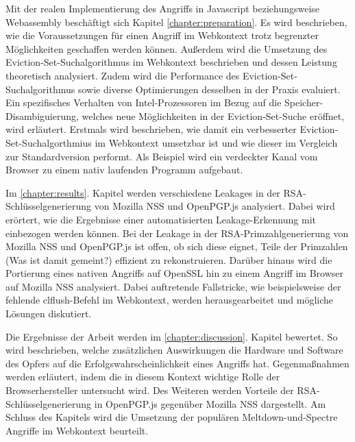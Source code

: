 \par \medskip                     

Mit der realen Implementierung des Angriffs in Javascript beziehungsweise Webassembly beschäftigt sich Kapitel \ref{chapter:preparation}.
Es wird beschrieben, wie die Voraussetzungen für einen Angriff im Webkontext trotz begrenzter Möglichkeiten geschaffen werden können.
Außerdem wird die Umsetzung des Eviction-Set-Suchalgorithmus im Webkontext beschrieben und dessen Leistung theoretisch analysiert.
Zudem wird die Performance des Eviction-Set-Suchalgorithmus sowie diverse Optimierungen desselben in der Praxis evaluiert.
Ein spezifisches Verhalten von Intel-Prozessoren im Bezug auf die Speicher-Disambiguierung, welches neue Möglichkeiten in der Eviction-Set-Suche eröffnet, wird erläutert.
Erstmals wird beschrieben, wie damit ein verbesserter Eviction-Set-Suchalgorthmius im Webkontext umsetzbar ist und wie dieser im Vergleich zur Standardversion performt.
Als Beispiel wird ein verdeckter Kanal vom Browser zu einem nativ laufenden Programm aufgebaut.

\par \medskip                      

Im \ref{chapter:results}. Kapitel werden verschiedene Leakages in der RSA-Schlüsselgenerierung von Mozilla NSS und OpenPGP.js analysiert.
Dabei wird erörtert, wie die Ergebnisse einer automatisierten Leakage-Erkennung mit einbezogen werden können.
Bei der Leakage in der RSA-Primzahlgenerierung von Mozilla NSS und OpenPGP.js ist offen, ob sich diese eignet, Teile der Primzahlen (Was ist damit gemeint?) effizient zu rekonstruieren.
Darüber hinaus wird die Portierung eines nativen Angriffs auf OpenSSL hin zu einem Angriff im Browser auf Mozilla NSS analysiert.
Dabei auftretende Fallstricke, wie beispielsweise der fehlende clflush-Befehl im Webkontext, werden herausgearbeitet und mögliche Lösungen diskutiert.

\par \medskip                       

Die Ergebnisse der Arbeit werden im \ref{chapter:discussion}. Kapitel bewertet.
So wird beschrieben, welche zusätzlichen Auswirkungen die Hardware und Software des Opfers auf die Erfolgswahrscheinlichkeit eines Angriffs hat.
Gegenmaßnahmen werden erläutert, indem die in diesem Kontext wichtige Rolle der Browserhersteller untersucht wird.
Des Weiteren werden Vorteile der RSA-Schlüsselgenerierung in OpenPGP.js gegenüber Mozilla NSS dargestellt.
Am Schluss des Kapitels wird die Umsetzung der populären Meltdown-und-Spectre Angriffe im Webkontext beurteilt.

